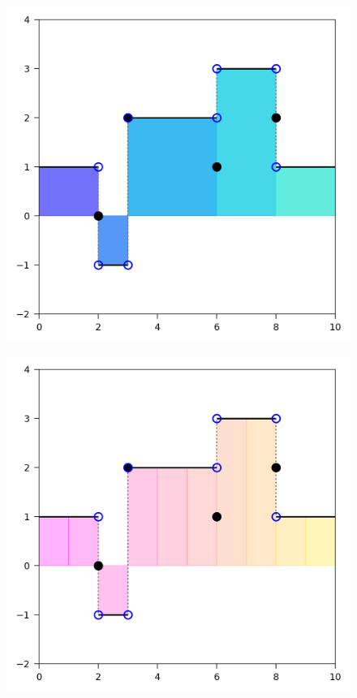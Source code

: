 \begin{figure}[h]
\centering
\begin{minipage}{.5\textwidth}
  \centering
  \includegraphics[scale=0.8]{Code/StepFilled3.png}
  \label{fig:stepfilled}
\end{minipage}%
\begin{minipage}{.5\textwidth}
  \centering
  \includegraphics[scale=0.8]{Code/StepFilled.png}
  \label{fig:stepfilled10}
\end{minipage}
\end{figure}


